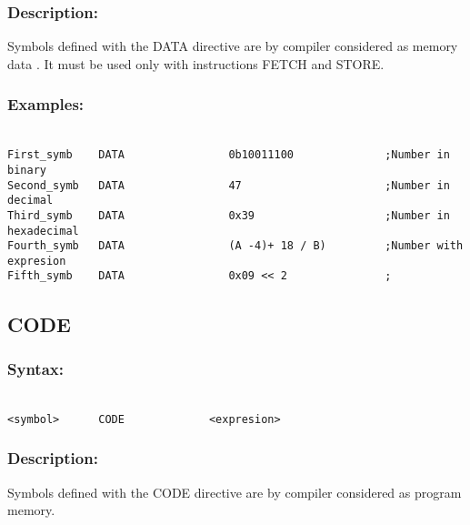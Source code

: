         \subsubsection{Description:}
            Symbols defined with the DATA directive are by compiler considered as memory data . It must be used only with instructions FETCH and STORE.

        \subsubsection{Examples:}
            {
                ~\\
                \usecodefont
                \verb'First_symb    DATA                0b10011100              ;Number in binary'\\
                \verb'Second_symb   DATA                47                      ;Number in decimal'\\
                \verb'Third_symb    DATA                0x39                    ;Number in hexadecimal'\\
                \verb'Fourth_symb   DATA                (A -4)+ 18 / B)         ;Number with expresion'\\
                \verb'Fifth_symb    DATA                0x09 << 2               ;'\\
            }
            
    \subsection{CODE}
        \subsubsection{Syntax:}
            {
                ~\\
                \usecodefont
            \verb'<symbol>      CODE             <expresion>'
            }
        \subsubsection{Description:}
        Symbols defined with the CODE directive are by compiler considered as program memory.

